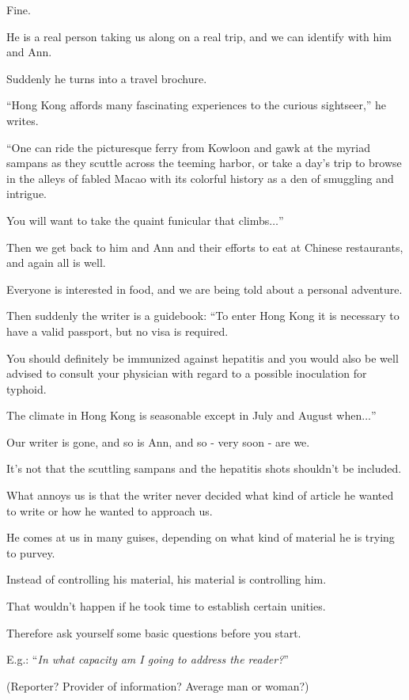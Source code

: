 \documentclass{book}
\numberwithin{equation}{section}
\begin{document}
Fine.

He is a real person taking us along on a real trip, and we can identify with him and Ann.

%
Suddenly he turns into a travel brochure.

``Hong Kong affords many fascinating experiences to the curious sightseer,'' he writes.

``One can ride the picturesque ferry from Kowloon and gawk at the myriad sampans as they scuttle across the teeming harbor, or take a day's trip to browse in the alleys of fabled Macao with its colorful history as a den of smuggling and intrigue.

You will want to take the quaint funicular that climbs$\ldots$''

Then we get back to him and Ann and their efforts to eat at Chinese restaurants, and again all is well.

Everyone is interested in food, and we are being told about a personal adventure.

%
Then suddenly the writer is a guidebook: ``To enter Hong Kong it is necessary to have a valid passport, but no visa is required.

You should definitely be immunized against hepatitis and you would also be well advised to consult your physician with regard to a possible inoculation for typhoid.

The climate in Hong Kong is seasonable except in July and August when$\ldots$''

Our writer is gone, and so is Ann, and so - very soon - are we.

%
It's not that the scuttling sampans and the hepatitis shots shouldn't be included.

What annoys us is that the writer never decided what kind of article he wanted to write or how he wanted to approach us.

He comes at us in many guises, depending on what kind of material he is trying to purvey.

Instead of controlling his material, his material is controlling him.

That wouldn't happen if he took time to establish certain unities.

%
Therefore ask yourself some basic questions before you start.

E.g.: ``\textit{In what capacity am I going to address the reader?}''

(Reporter? Provider of information? Average man or woman?)
\end{document}

